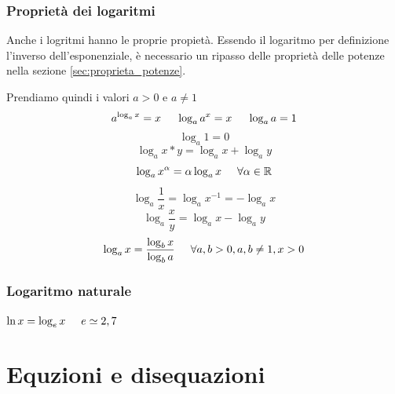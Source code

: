 \subsubsection*{Proprietà dei logaritmi}
Anche i logritmi hanno le proprie propietà. Essendo il logaritmo per definizione l'inverso dell'esponenziale, è necessario un ripasso delle proprietà delle potenze nella sezione \ref{sec:proprieta_potenze}.

Prendiamo quindi i valori $a>0$ e $a\neq 1$
\begin{equation}
    a^{\log_{a}{x}}=x\hspace{0,5cm}\log_{a}{a^x}=x\hspace{0,5cm}\log_{a}{a}=1
\end{equation}
\begin{equation}
    \log_{a}{1}=0
\end{equation}
\begin{equation}
    \log_{a}{x*y}=\log_{a}{x}+\log_{a}{y}
\end{equation}
\begin{equation}
    \log_{a}{x^\alpha}=\alpha\log_{a}{x}\hspace{0,5cm}\forall\alpha\in\mathbb{R}
\end{equation}
\begin{equation}
    \log_{a}{\frac{1}{x}}=\log_{a}{x^{-1}}=-\log_{a}{x}
\end{equation}
\begin{equation}
    \log_{a}{\frac{x}{y}}=\log_{a}{x}-\log_{a}{y}
\end{equation}
\begin{equation}
    \log_{a}{x}=\frac{\log_{b}{x}}{\log_{b}{a}}\hspace{0,5cm}\forall a,b>0, a,b\neq 1, x>0
\end{equation}

\subsubsection*{Logaritmo naturale}
$\ln{x}=\log_{e}{x}\hspace{0,5cm}e\simeq 2,7$

\section{Equzioni e disequazioni}

